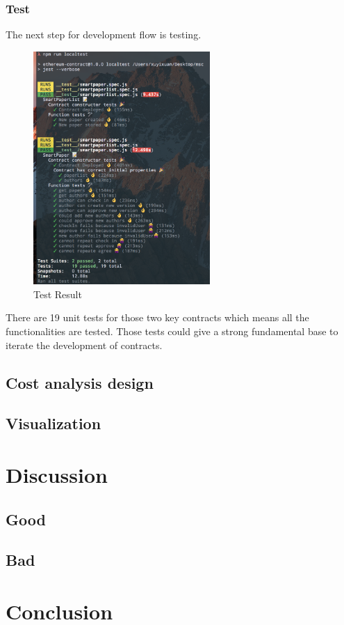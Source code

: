 \documentclass{ecsthesis}      %
\begin{document}
\subsection{Test}
The next step for development flow is testing.
\begin{figure}[H]
  \centering
  \includegraphics[width=0.6\textwidth]{test.png}
  \caption{Test Result}
  \label{test} 
\end{figure}
There are 19 unit tests for those two key contracts which means all the functionalities are tested. 
Those tests could give a strong fundamental base to iterate the development of contracts.
\section{Cost analysis design}
\section{Visualization}
\chapter{Discussion}
\section{Good}
\section{Bad}
\chapter{Conclusion}
\backmatter


\end{document}
